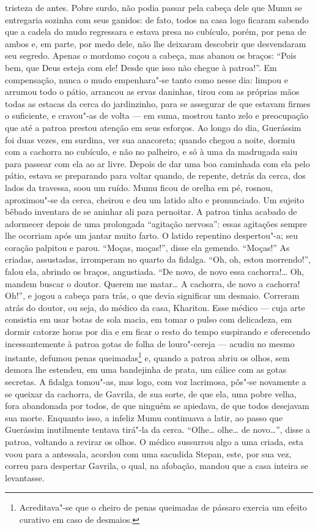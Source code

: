 tristeza de antes. Pobre surdo, não podia passar pela cabeça dele que
Mumu se entregaria sozinha com seus ganidos: de fato, todos na casa logo
ficaram sabendo que a cadela do mudo regressara e estava presa no
cubículo, porém, por pena de ambos e, em parte, por medo dele, não lhe
deixaram descobrir que desvendaram seu segredo. Apenas o mordomo coçou a
cabeça, mas abanou os braços: ``Pois bem, que Deus esteja com ele! Desde
que isso não chegue à patroa!''. Em compensação, nunca o mudo
empenhara"-se tanto como nesse dia: limpou e arrumou todo o pátio,
arrancou as ervas daninhas, tirou com as próprias mãos todas as estacas
da cerca do jardinzinho, para se assegurar de que estavam firmes o
suficiente, e cravou"-as de volta --- em suma, mostrou tanto zelo e
preocupação que até a patroa prestou atenção em seus esforços. Ao longo
do dia, Guerássim foi duas vezes, em surdina, ver sua anacoreta; quando
chegou a noite, dormiu com a cachorra no cubículo, e não no palheiro, e
só à uma da madrugada saiu para passear com ela ao ar livre. Depois de
dar uma boa caminhada com ela pelo pátio, estava se preparando para
voltar quando, de repente, detrás da cerca, dos lados da travessa, soou
um ruído. Mumu ficou de orelha em pé, rosnou, aproximou"-se da cerca,
cheirou e deu um latido alto e pronunciado. Um sujeito bêbado inventara
de se aninhar ali para pernoitar. A patroa tinha acabado de adormecer
depois de uma prolongada ``agitação nervosa'': essas agitações sempre
lhe ocorriam após um jantar muito farto. O latido repentino despertou"-a;
seu coração palpitou e parou. ``Moças, moças!'', disse ela gemendo.
``Moças!'' As criadas, assustadas, irromperam no quarto da fidalga.
``Oh, oh, estou morrendo!'', falou ela, abrindo os braços, angustiada.
``De novo, de novo essa cachorra!\ldots{} Oh, mandem buscar o doutor. Querem
me matar\ldots{} A cachorra, de novo a cachorra! Oh!'', e jogou a cabeça para
trás, o que devia significar um desmaio. Correram atrás do doutor, ou
seja, do médico da casa, Khariton. Esse médico --- cuja arte consistia
em usar botas de sola macia, em tomar o pulso com delicadeza, em dormir
catorze horas por dia e em ficar o resto do tempo suspirando e
oferecendo incessantemente à patroa gotas de folha de louro"-cereja ---
acudiu no mesmo instante, defumou penas queimadas\footnote{Acreditava"-se
  que o cheiro de penas queimadas de pássaro exercia um efeito curativo
  em caso de desmaios.} e, quando a patroa abriu os olhos, sem demora
lhe estendeu, em uma bandejinha de prata, um cálice com as gotas
secretas. A fidalga tomou"-as, mas logo, com voz lacrimosa, pôs"-se
novamente a se queixar da cachorra, de Gavrila, de sua sorte, de que
ela, uma pobre velha, fora abandonada por todos, de que ninguém se
apiedava, de que todos desejavam sua morte. Enquanto isso, a infeliz
Mumu continuava a latir, ao passo que Guerássim inutilmente tentava tirá"-la
da cerca. ``Olhe\ldots{} olhe\ldots{} de novo\ldots{}'', disse a patroa, voltando a
revirar os olhos. O médico sussurrou algo a uma criada, esta voou para a
antessala, acordou com uma sacudida Stepan, este, por sua vez, correu
para despertar Gavrila, o qual, na afobação, mandou que a casa inteira se
levantasse.

